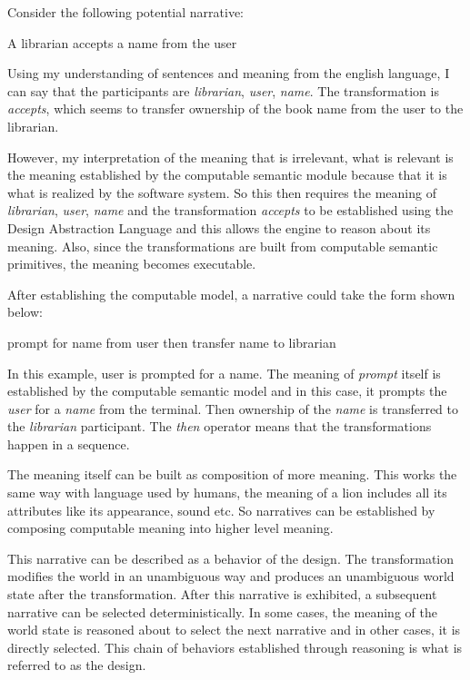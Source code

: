 Consider the following potential narrative:

\begin{greyquote}
    A librarian accepts a name from the user
\end{greyquote}

Using my understanding of sentences and meaning from the english language, I can say that the participants are \emph{librarian}, \emph{user}, \emph{name}. The transformation is \emph{accepts}, which seems to transfer ownership of the book name from the user to the librarian.

However, my interpretation of the meaning that is irrelevant, what is relevant is the meaning established by the computable semantic module because that it is what is realized by the software system. So this then requires the meaning of \emph{librarian}, \emph{user}, \emph{name} and the transformation \emph{accepts} to be established using the Design Abstraction Language and this allows the engine to reason about its meaning. Also, since the transformations are built from computable semantic primitives, the meaning becomes executable.

After establishing the computable model, a narrative could take the form shown below:

\begin{greyquote}
    prompt for name from user then transfer name to librarian
\end{greyquote}

In this example, user is prompted for a name. The meaning of \emph{prompt} itself is established by the computable semantic model and in this case, it prompts the \emph{user} for a \emph{name} from the terminal. Then ownership of the \emph{name} is transferred to the \emph{librarian} participant. The \emph{then} operator means that the transformations happen in a sequence.

The meaning itself can be built as composition of more meaning. This works the same way with language used by humans, the meaning of a lion includes all its attributes like its appearance, sound etc. So narratives can be established by composing computable meaning into higher level meaning.

This narrative can be described as a behavior of the design. The transformation modifies the world in an unambiguous way and produces an unambiguous world state after the transformation. After this narrative is exhibited, a subsequent narrative can be selected deterministically. In some cases, the meaning of the world state is reasoned about to select the next narrative and in other cases, it is directly selected. This chain of behaviors established through reasoning is what is referred to as the design.


